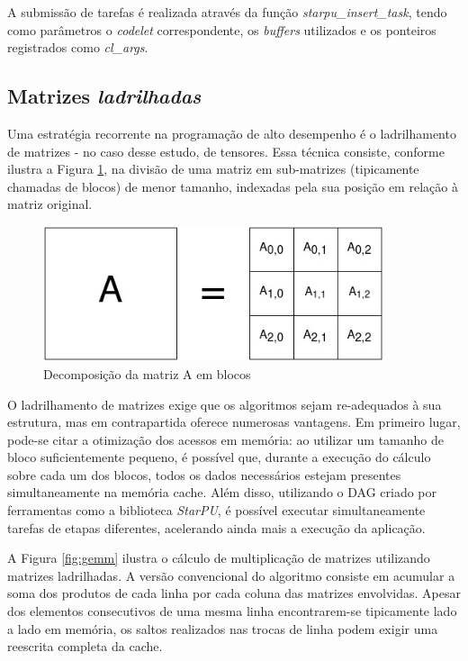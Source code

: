 \documentclass[cic,tc]{iiufrgs}
\begin{document}
A submissão de tarefas é realizada através da função \textit{starpu\_insert\_task}, tendo como parâmetros o \textit{codelet} correspondente, os \textit{buffers} utilizados e
os ponteiros registrados como \textit{cl\_args}. 

\subsection{Matrizes \textit{ladrilhadas}}

Uma estratégia recorrente na programação de alto desempenho é o ladrilhamento de matrizes - no caso desse estudo, de tensores. Essa técnica consiste, conforme ilustra a Figura \ref{fig:tiled_matrix},
na divisão de uma matriz em sub-matrizes (tipicamente chamadas de blocos) de menor tamanho, indexadas pela sua posição em relação à matriz original.

\begin{figure}[!htb]
    \caption{Decomposição da matriz A em blocos}
    \begin{center}
      \includegraphics[width=27em]{tiled_matrix}
    \end{center}
    \label{fig:tiled_matrix}
\end{figure}

O ladrilhamento de matrizes exige que os algoritmos sejam re-adequados à sua estrutura, mas em contrapartida oferece numerosas vantagens. Em primeiro lugar, pode-se citar a
otimização dos acessos em memória: ao utilizar um tamanho de bloco suficientemente pequeno, é possível que, durante a execução do cálculo sobre cada um dos blocos, todos os dados
necessários estejam presentes simultaneamente na memória cache. Além disso, utilizando o DAG criado por ferramentas como a biblioteca \textit{StarPU}, é possível executar
simultaneamente tarefas de etapas diferentes, acelerando ainda mais a execução da aplicação.

A Figura \ref{fig:gemm} ilustra o cálculo de multiplicação de matrizes utilizando matrizes ladrilhadas. A versão convencional do algoritmo consiste em acumular a soma dos produtos de
cada linha por cada coluna das matrizes envolvidas. Apesar dos elementos consecutivos de uma mesma linha encontrarem-se tipicamente lado a lado em memória, os saltos realizados nas trocas
de linha podem exigir uma reescrita completa da cache.
\end{document}
